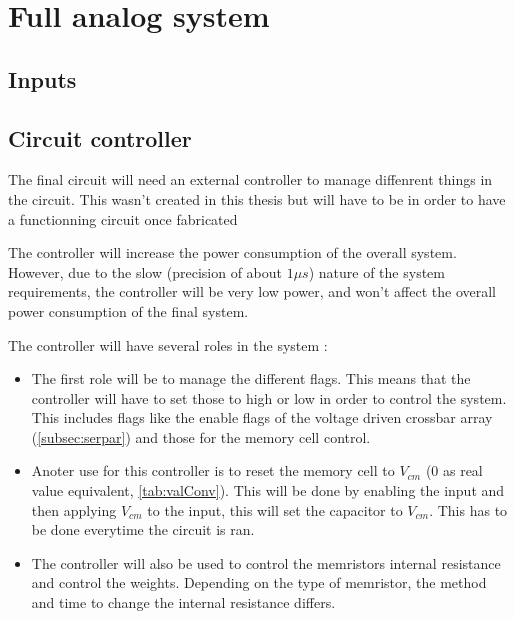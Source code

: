 \section{Full analog system}\label{sec:fullsys}

\subsection{Inputs}%

\subsection{Circuit controller}%

The final circuit will need an external controller to manage diffenrent things in the circuit. This wasn't created in this thesis but will have to be in order to have a functionning circuit once fabricated %

The controller will increase the power consumption of the overall system. However, due to the slow (precision of about $1\mu s$) nature of the system requirements, the controller will be very low power, and won't affect the overall power consumption of the final system.

The controller will have several roles in the system :
\begin{itemize}
  \item The first role will be to manage the different flags. This means that the controller will have to set those to high or low in order to control the system. This includes flags like the enable flags of the voltage driven crossbar array (\cref{subsec:serpar}) and those for the memory cell control.
  \item Anoter use for this controller is to reset the memory cell to $V_{cm}$ ($0$ as real value equivalent, \cref{tab:valConv}). This will be done by enabling the input and then applying $V_{cm}$ to the input, this will set the capacitor to $V_{cm}$. This has to be done everytime the circuit is ran.
  \item The controller will also be used to control the memristors internal resistance and control the weights. Depending on the type of memristor, the method and time to change the internal resistance differs.
\end{itemize}
